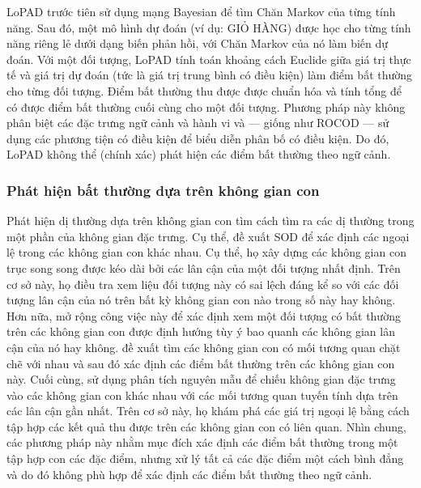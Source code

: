 LoPAD \citep{lu2020lopad} trước tiên sử dụng mạng Bayesian để tìm Chăn Markov của từng tính năng. Sau đó, một mô hình dự đoán (ví dụ: GIỎ HÀNG) được học cho từng tính năng riêng lẻ dưới dạng biến phản hồi, với Chăn Markov của nó làm biến dự đoán. Với một đối tượng, LoPAD tính toán khoảng cách Euclide giữa giá trị thực tế và giá trị dự đoán (tức là giá trị trung bình có điều kiện) làm điểm bất thường cho từng đối tượng. Điểm bất thường thu được được chuẩn hóa và tính tổng để có được điểm bất thường cuối cùng cho một đối tượng. Phương pháp này không phân biệt các đặc trưng ngữ cảnh và hành vi và --- giống như ROCOD --- sử dụng các phương tiện có điều kiện để biểu diễn phân bố có điều kiện. Do đó, LoPAD không thể (chính xác) phát hiện các điểm bất thường theo ngữ cảnh.

\subsubsection{Phát hiện bất thường dựa trên không gian con}
Phát hiện dị thường dựa trên không gian con tìm cách tìm ra các dị thường trong một phần của không gian đặc trưng. Cụ thể, \cite{kriegel2009outlier} đề xuất SOD để xác định các ngoại lệ trong các không gian con khác nhau. Cụ thể, họ xây dựng các không gian con trục song song được kéo dài bởi các lân cận của một đối tượng nhất định. Trên cơ sở này, họ điều tra xem liệu đối tượng này có sai lệch đáng kể so với các đối tượng lân cận của nó trên bất kỳ không gian con nào trong số này hay không. Hơn nữa, \cite{kriegel2012outlier} mở rộng công việc này để xác định xem một đối tượng có bất thường trên các không gian con được định hướng tùy ý bao quanh các không gian lân cận của nó hay không. \cite{nguyen2013cmi} đề xuất tìm các không gian con có mối tương quan chặt chẽ với nhau và sau đó xác định các điểm bất thường trên các không gian con này. Cuối cùng, \cite{cabero2021archetype} sử dụng phân tích nguyên mẫu để chiếu không gian đặc trưng vào các không gian con khác nhau với các mối tương quan tuyến tính dựa trên các lân cận gần nhất. Trên cơ sở này, họ khám phá các giá trị ngoại lệ bằng cách tập hợp các kết quả thu được trên các không gian con có liên quan. Nhìn chung, các phương pháp này nhằm mục đích xác định các điểm bất thường trong một tập hợp con các đặc điểm, nhưng xử lý tất cả các đặc điểm một cách bình đẳng và do đó không phù hợp để xác định các điểm bất thường theo ngữ cảnh.
